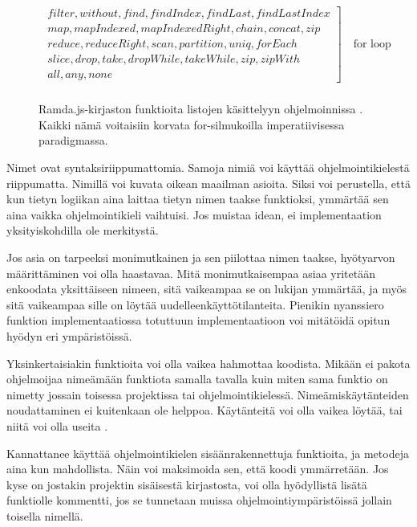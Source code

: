 \begin{figure}[ht]
    \centering
    \[
        \begin{array}{rl}
            \left.
            \begin{array}{l}
                filter, without, find, findIndex, findLast, findLastIndex \\
                map, mapIndexed, mapIndexedRight, chain, concat, zip      \\
                reduce, reduceRight, scan, partition, uniq, forEach       \\
                slice, drop, take, dropWhile, takeWhile, zip, zipWith     \\
                all, any, none
            \end{array}
            \right] \quad \text{for loop}
            \\
        \end{array}
    \]
    \caption{Ramda.js-kirjaston funktioita listojen käsittelyyn ohjelmoinnissa \cite{ramda:docs}. Kaikki nämä voitaisiin korvata for-silmukoilla imperatiivisessa paradigmassa.}
    \label{fig:ramdacmds}
\end{figure}

Nimet ovat syntaksiriippumattomia. Samoja nimiä voi käyttää ohjelmointikielestä riippumatta. Nimillä voi kuvata oikean maailman asioita. Siksi voi perustella, että kun tietyn logiikan aina laittaa tietyn nimen taakse funktioksi, ymmärtää sen aina vaikka ohjelmointikieli vaihtuisi. Jos muistaa idean, ei implementaation yksityiskohdilla ole merkitystä.

Jos asia on tarpeeksi monimutkainen ja sen piilottaa nimen taakse, hyötyarvon määrittäminen voi olla haastavaa. Mitä monimutkaisempaa asiaa yritetään enkoodata yksittäiseen nimeen, sitä vaikeampaa se on lukijan ymmärtää, ja myös sitä vaikeampaa sille on löytää uudelleenkäyttötilanteita. Pienikin nyanssiero funktion implementaatiossa totuttuun implementaatioon voi mitätöidä opitun hyödyn eri ympäristöissä.

Yksinkertaisiakin funktioita voi olla vaikea hahmottaa koodista. Mikään ei pakota ohjelmoijaa nimeämään funktiota samalla tavalla kuin miten sama funktio on nimetty jossain toisessa projektissa tai ohjelmointikielessä. Nimeämiskäytänteiden noudattaminen ei kuitenkaan ole helppoa. Käytänteitä voi olla vaikea löytää, tai niitä voi olla useita \cite{ramda:docs}.

Kannattanee käyttää ohjelmointikielen sisäänrakennettuja funktioita, ja metodeja aina kun mahdollista. Näin voi maksimoida sen, että koodi ymmärretään. Jos kyse on jostakin projektin sisäisestä kirjastosta, voi olla hyödyllistä lisätä funktiolle kommentti, jos se tunnetaan muissa ohjelmointiympäristöissä jollain toisella nimellä.

